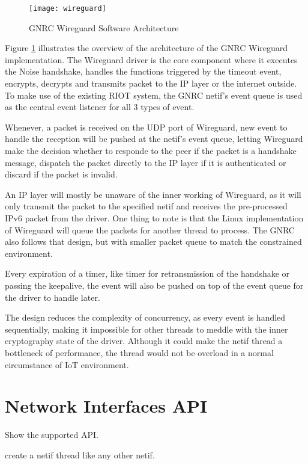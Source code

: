   \begin{figure}[h]
    \centering
    \texttt{[image: wireguard]}
    \caption{GNRC Wireguard Software Architecture}
    \label{fig:wireguard}
  \end{figure}

  Figure \ref{fig:wireguard} illustrates the overview of the architecture of the GNRC Wireguard
  implementation. The Wireguard driver is the core component where it executes the Noise handshake,
  handles the functions triggered by the timeout event, encrypts, decrypts and transmits packet to
  the IP layer or the internet outside. To make use of the existing RIOT system, the GNRC netif's
  event queue is used as the central event listener for all 3 types of event. 
  
  Whenever, a packet is received on the UDP port of Wireguard, new event to handle the reception will be pushed
  at the netif's event queue, letting Wireguard make the decision whether to responde to 
  the peer if the packet is a handshake message, dispatch the packet directly to the IP layer if 
  it is authenticated or discard if the packet is invalid. 

  An IP layer will mostly be unaware of the inner working of Wireguard, as it will only transmit the
  packet to the specified netif and receives the pre-processed IPv6 packet from the driver. One thing
  to note is that the Linux implementation of Wireguard will queue the packets for another thread
  to process. The GNRC also follows that design, but with smaller packet queue to match the
  constrained environment.

  Every expiration of a timer, like timer for retransmission of the handshake or passing the
  keepalive, the event will also be pushed on top of the event queue for the driver to handle later.
  
  The design reduces the complexity of concurrency, as every event is handled sequentially, making it impossible for 
  other threads to
  meddle with the inner cryptography state of the driver. Although it could make the netif thread
  a bottleneck of performance, the thread would not be overload in a normal circumstance of
  IoT environment.

\section{Network Interfaces API}
  Show the supported API.

  create a netif thread like any other netif.
  
